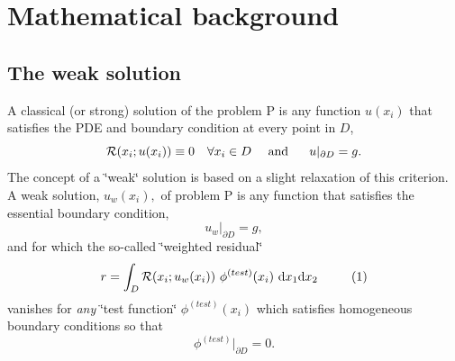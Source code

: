  

\hypertarget{index_mathFE}{}\section{Mathematical background}\label{index_mathFE}
\hypertarget{index_weaksoln}{}\subsection{The weak solution}\label{index_weaksoln}
A classical (or strong) solution of the problem P is any function $ u(x_i) $ that satisfies the P\-D\-E and boundary condition at every point in $ D$, \[ {\cal R}(x_i; u(x_i)) \equiv 0 \ \ \ \forall x_i \in D \mbox{\ \ \ \ and \ \ \ \ } u|_{\partial D} = g. \] The concept of a \char`\"{}weak\char`\"{} solution is based on a slight relaxation of this criterion. A weak solution, $u_w(x_i), $ of problem P is any function that satisfies the essential boundary condition, \[ u_w|_{\partial D} = g, \] and for which the so-\/called \char`\"{}weighted residual\char`\"{} \[ r = \int_{D} {\cal R}(x_i; u_w(x_i)) \ \phi^{(test)}(x_i) \ \mbox{d}x_1 \mbox{d}x_2 \ \ \ \ \ \ \ \ (1) \] vanishes for {\itshape any} \char`\"{}test function\char`\"{} $ \phi^{(test)}(x_i) $ which satisfies homogeneous boundary conditions so that \[ \phi^{(test)}|_{\partial D} = 0. \]


